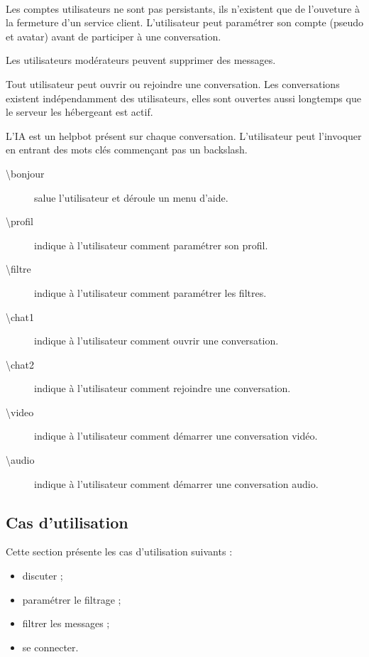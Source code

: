 \documentclass[11pt,dvipsnames,svgnames]{report}
\begin{document}
\begin{mdframed}[topline=false,rightline=false,bottomline=false, linewidth=3pt,linecolor=red]
~\\\indent Les comptes utilisateurs ne sont pas persistants, ils n'existent que de l'ouveture à la fermeture d'un service client. L'utilisateur peut paramétrer son compte (pseudo et avatar) avant de participer à une conversation.

Les utilisateurs modérateurs peuvent supprimer des messages.

Tout utilisateur peut ouvrir ou rejoindre une conversation. Les conversations existent indépendamment des utilisateurs, elles sont ouvertes aussi longtemps que le serveur les hébergeant est actif.

L'IA est un helpbot présent sur chaque conversation. L'utilisateur peut l'invoquer en entrant des mots clés commençant pas un backslash.
\begin{description}
\item[\textbackslash bonjour] salue l'utilisateur et déroule un menu d'aide.
\item[\textbackslash profil] indique à l'utilisateur comment paramétrer son profil.
\item[\textbackslash filtre] indique à l'utilisateur comment paramétrer les filtres.
\item[\textbackslash chat1] indique à l'utilisateur comment ouvrir une conversation.
\item[\textbackslash chat2] indique à l'utilisateur comment rejoindre une conversation.
\item[\textbackslash video] indique à l'utilisateur comment démarrer une conversation vidéo.
\item[\textbackslash audio] indique à l'utilisateur comment démarrer une conversation audio.
\end{description}


\end{mdframed}

\subsection*{Cas d'utilisation}

Cette section présente les cas d'utilisation suivants :
\begin{itemize}
\item discuter ;
\item paramétrer le filtrage ;
\item filtrer les messages ;
\item se connecter.
\end{itemize}
\end{document}

